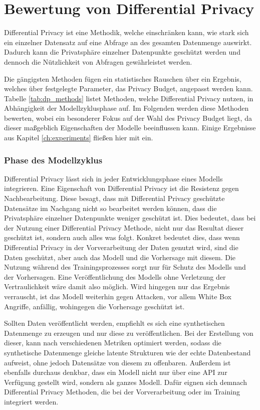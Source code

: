 \section{Bewertung von Differential Privacy}\label{sec:bw_dp}

Differential Privacy ist eine Methodik, welche einschränken kann, wie stark sich ein einzelner Datensatz auf eine Abfrage an des gesamten Datenmenge auswirkt.
Dadurch kann die Privatsphäre einzelner Datenpunkte geschützt werden und dennoch die Nützlichkeit von Abfragen gewährleistet werden.



Die gängigsten Methoden fügen ein statistisches Rauschen über ein Ergebnis, welches über festgelegte Parameter, das Privacy Budget, angepasst werden kann.
Tabelle \ref{tab:dp_methods} listet Methoden, welche Differential Privacy nutzen, in Abhängigkeit der Modellzyklusphase auf.
Im Folgenden werden diese Methoden bewerten, wobei ein besonderer Fokus auf der Wahl des Privacy Budget liegt, da dieser maßgeblich Eigenschaften der Modelle beeinflussen kann.
Einige Ergebnisse aus Kapitel \ref{ch:experiments} fließen hier mit ein.


\subsubsection*{Phase des Modellzyklus}
Differential Privacy lässt sich in jeder Entwicklungsphase eines Modells integrieren.
Eine Eigenschaft von Differential Privacy ist die Resistenz gegen Nachbearbeitung.
Diese besagt, dass mit Differential Privacy geschützte Datensätze im Nachgang nicht so bearbeitet werden können, dass die Privatsphäre einzelner Datenpunkte weniger geschützt ist.
Dies bedeutet, dass bei der Nutzung einer Differential Privacy Methode, nicht nur das Resultat dieser geschützt ist, sondern auch alles was folgt.
Konkret bedeutet dies, dass wenn Differential Privacy in der Vorverarbeitung der Daten genutzt wird, sind die Daten geschützt, aber auch das Modell und die Vorhersage mit diesem.
Die Nutzung während des Trainingsprozesses sorgt nur für Schutz des Modells und der Vorhersagen. 
Eine Veröffentlichung des Modells ohne Verletzung der Vertraulichkeit wäre damit also möglich.
Wird hingegen nur das Ergebnis verrauscht, ist das Modell weiterhin gegen Attacken, vor allem White Box Angriffe, anfällig, wohingegen die Vorhersage geschützt ist.

Sollten Daten veröffentlicht werden, empfiehlt es sich eine synthetischen Datenmenge zu erzeugen und nur diese zu veröffentlichen.
Bei der Erstellung von dieser, kann nach verschiedenen Metriken optimiert werden, sodass die synthetische Datenmenge gleiche latente Strukturen wie der echte Datenbestand aufweist, ohne jedoch Datensätze von diesem zu offenbaren.
Außerdem ist ebenfalls durchaus denkbar, dass ein Modell nicht nur über eine API zur Verfügung gestellt wird, sondern als ganzes Modell. 
Dafür eignen sich demnach Differential Privacy Methoden, die bei der Vorverarbeitung oder im Training integriert werden.

